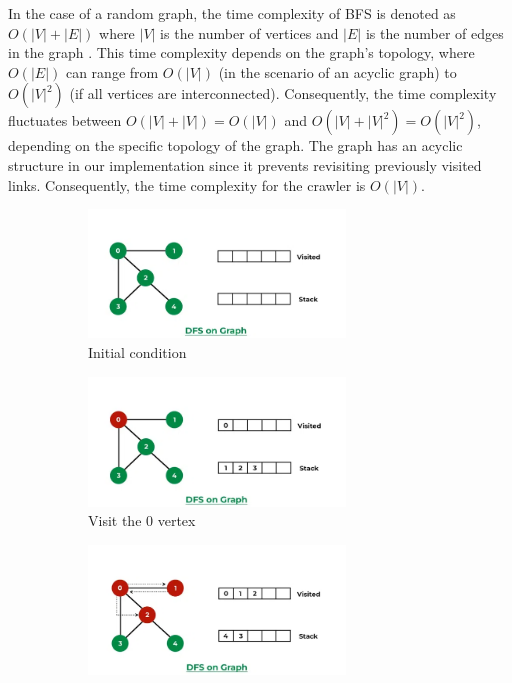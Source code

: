 In the case of a random graph, the time complexity of BFS is denoted as $O(|V|+|E|)$ where $|V|$ is the number of vertices and $|E|$ is the number of edges in the graph \cite{cormen01introduction}. This time complexity depends on the graph's topology, where $O(|E|)$ can range from $O(|V|)$ (in the scenario of an acyclic graph) to $O(|V|^2)$ (if all vertices are interconnected). Consequently, the time complexity fluctuates between $O(|V| + |V|) = O(|V|)$ and $O(|V| + |V|^2) = O(|V|^2)$, depending on the specific topology of the graph. The graph has an acyclic structure in our implementation since it prevents revisiting previously visited links. Consequently, the time complexity for the crawler is $O(|V|)$.
\begin{figure}[ht] 
  \begin{subfigure}[b]{0.5\textwidth}
    \centering
    \includegraphics[width=0.75\textwidth]{figures/dfs-1.png} 
    \caption{Initial condition} 
    \label{fig7:a} 
    \vspace{4ex}
  \end{subfigure}%
  \begin{subfigure}[b]{0.5\textwidth}
    \centering
    \includegraphics[width=0.75\textwidth]{figures/dfs-2.png} 
    \caption{Visit the 0 vertex}  
    \label{fig7:b} 
    \vspace{4ex}
  \end{subfigure} 
  \begin{subfigure}[b]{0.5\textwidth}
    \centering
    \includegraphics[width=0.75\textwidth]{figures/dfs-3.png} 

\end{subfigure}
\end{figure}

